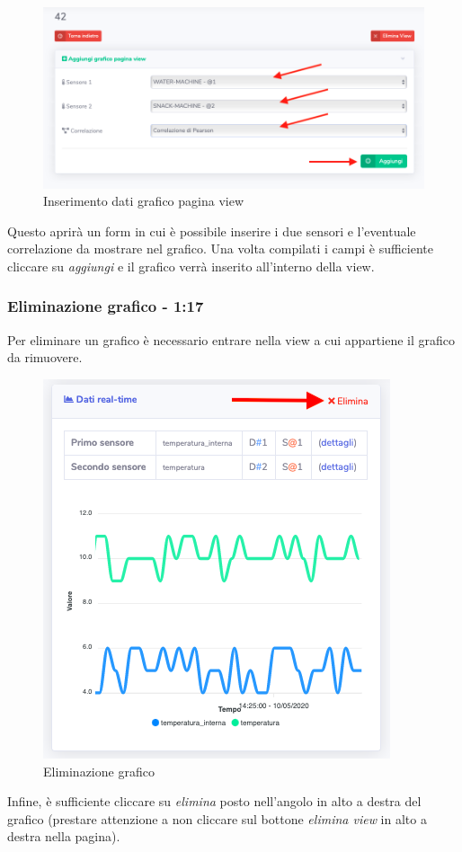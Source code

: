 		\begin{figure}[H]
		\centering
		\includegraphics[scale=0.450]{res/images/membro/insDatiGrafico.png}
		\caption{Inserimento dati grafico pagina view}
	\end{figure}
		Questo aprirà un form in cui è possibile inserire i due sensori e l'eventuale correlazione da mostrare nel grafico. Una volta compilati i campi è sufficiente cliccare su \textit{aggiungi} e il grafico verrà inserito all'interno della view.

	\subsubsection{Eliminazione grafico - 1:17}
		Per eliminare un grafico è necessario entrare nella view a cui appartiene il grafico da rimuovere. 
		\begin{figure}[H]
		\centering
		\includegraphics[scale=0.700]{res/images/membro/eliminazGrafico.png}
		\caption{Eliminazione grafico}
		\end{figure}
		Infine, è sufficiente cliccare su \textit{elimina} posto nell'angolo in alto a destra del grafico (prestare attenzione a non cliccare sul bottone \textit{elimina view} in alto a destra nella pagina).

